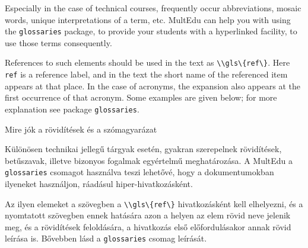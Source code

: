 {
Especially in the case of technical courses, frequently occur abbreviations, mosaic words, unique interpretations of a term, etc. \gls{MultEdu} can help you
with using the \lstinline|glossaries| package, to provide your students 
with a hyperlinked facility, to use those terms consequently.

References to such elements should be used in the text as \lstinline|\\gls\{ref\}|.
Here \lstinline|ref| is a reference label, and in the text the short 
name of the referenced item appears at that place. In the case of acronyms, the 
expansion also appears at the first occurrence of that acronym.
Some examples are given below; for more explanation see package \lstinline|glossaries|.
}
{Mire jók a rövidítések és a szómagyarázat}
{

Különösen technikai jellegű tárgyak esetén, gyakran szerepelnek 
rövidítések, betűszavak, illetve bizonyos fogalmak egyértelmű meghatározása.
A \gls{MultEdu} a \lstinline|glossaries| csomagot használva teszi lehetővé,
hogy a dokumentumokban ilyeneket használjon, ráadásul hiper-hivatkozásként.
 
Az ilyen elemeket a szövegben  a \lstinline|\\gls\{ref\}| hivatkozásként kell elhelyezni,
és a nyomtatott szövegben ennek hatására azon a helyen az elem rövid neve jelenik meg, és a rövidítések feloldására, a hivatkozás első
előfordulásakor annak rövid leírása is. Bővebben lásd a \lstinline|glossaries| 
csomag leírását.
}


